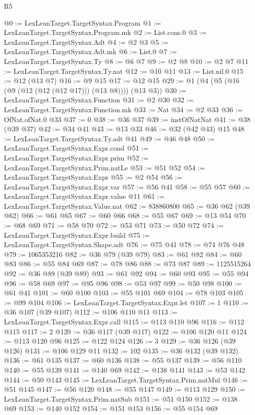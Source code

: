 \begin{lexlean}{R5}
\begin{coremodule}
@0 := LexLeanTarget.TargetSyntax.Program
@1 := LexLeanTarget.TargetSyntax.Program.mk
@2 := List.cons.{0}
@3 := LexLeanTarget.TargetSyntax.Adt
@4 := @2 @3
@5 := LexLeanTarget.TargetSyntax.Adt.mk
@6 := List.{0}
@7 := LexLeanTarget.TargetSyntax.Ty
@8 := @6 @7
@9 := @2 @8
@10 := @2 @7
@11 := LexLeanTarget.TargetSyntax.Ty.nat
@12 := @10 @11
@13 := List.nil.{0}
@15 := @12 (@13 @7)
@16 := @9 @15
@17 := @12 @15
@29 := @1 (@4 (@5 (@16 (@9 (@12 (@12 (@12 @17))) (@13 @8)))) (@13 @3))
@30 := LexLeanTarget.TargetSyntax.Function
@31 := @2 @30
@32 := LexLeanTarget.TargetSyntax.Function.mk
@33 := Nat
@34 := @2 @33
@36 := OfNat.ofNat.{0} @33
@37 := 0
@38 := @36 @37
@39 := instOfNatNat
@41 := @38 (@39 @37)
@42 := @34 @41
@43 := @13 @33
@46 := @32 (@42 @43) @15
@48 := LexLeanTarget.TargetSyntax.Ty.adt @41
@49 := @46 @48
@50 := LexLeanTarget.TargetSyntax.Expr.cond
@51 := LexLeanTarget.TargetSyntax.Expr.prim
@52 := LexLeanTarget.TargetSyntax.Prim.natLe
@53 := @51 @52
@54 := LexLeanTarget.TargetSyntax.Expr
@55 := @2 @54
@56 := LexLeanTarget.TargetSyntax.Expr.var
@57 := @56 @41
@58 := @55 @57
@60 := LexLeanTarget.TargetSyntax.Expr.value @11
@61 := LexLeanTarget.TargetSyntax.Value.nat
@62 := 838860800
@65 := @36 @62 (@39 @62)
@66 := @61 @65
@67 := @60 @66
@68 := @55 @67
@69 := @13 @54
@70 := @68 @69
@71 := @58 @70
@72 := @53 @71
@73 := @50 @72
@74 := LexLeanTarget.TargetSyntax.Expr.build
@75 := LexLeanTarget.TargetSyntax.Shape.adt
@76 := @75 @41
@78 := @74 @76 @48
@79 := 1065353216
@82 := @36 @79 (@39 @79)
@83 := @61 @82
@84 := @60 @83
@86 := @55 @84 @69
@87 := @78 @86
@88 := @73 @87
@89 := 1125515264
@92 := @36 @89 (@39 @89)
@93 := @61 @92
@94 := @60 @93
@95 := @55 @94
@96 := @58 @69
@97 := @95 @96
@98 := @53 @97
@99 := @50 @98
@100 := @61 @41
@101 := @60 @100
@103 := @55 @101 @69
@104 := @78 @103
@105 := @99 @104
@106 := LexLeanTarget.TargetSyntax.Expr.let
@107 := 1
@110 := @36 @107 (@39 @107)
@112 := @106 @110 @11
@113 := LexLeanTarget.TargetSyntax.Expr.call
@115 := @113 @110 @96
@116 := @112 @115
@117 := 2
@120 := @36 @117 (@39 @117)
@122 := @106 @120 @11
@124 := @113 @120 @96
@125 := @122 @124
@126 := 3
@129 := @36 @126 (@39 @126)
@131 := @106 @129 @11
@132 := 102
@135 := @36 @132 (@39 @132)
@136 := @61 @135
@137 := @60 @136
@138 := @55 @137
@139 := @56 @110
@140 := @55 @139
@141 := @140 @69
@142 := @138 @141
@143 := @53 @142
@144 := @50 @143
@145 := LexLeanTarget.TargetSyntax.Prim.natMul
@146 := @51 @145
@147 := @56 @120
@148 := @55 @147
@149 := @113 @129
@150 := LexLeanTarget.TargetSyntax.Prim.natSub
@151 := @51 @150
@152 := @138 @69
@153 := @140 @152
@154 := @151 @153
@156 := @55 @154 @69

\end{coremodule}
\end{lexlean}
